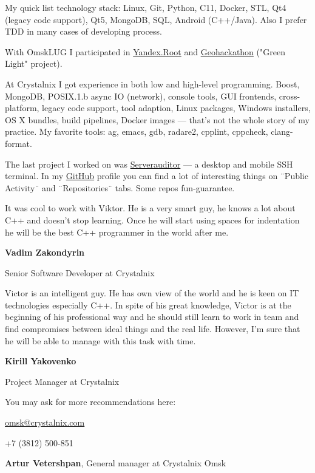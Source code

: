 \documentclass[letterpaper,11pt]{article}
\newlength{\outerbordwidth}
\newcommand{\resheading}[1]{\vspace{5pt}
  \parbox{\textwidth}{\setlength{\FrameSep}{\outerbordwidth}
    \begin{shaded}
\setlength{\fboxsep}{0pt}\framebox[\textwidth][l]{\setlength{\fboxsep}{4pt}\fcolorbox{shadecolorB}{shadecolorB}{\textbf{\sffamily{\mbox{~}\makebox[6.762in][l]{\large #1} \vphantom{p\^{E}}}}}}
    \end{shaded}
  }\vspace{-5pt}
}
\begin{document}
	My quick list technology stack: Linux, Git, Python, C11, Docker, STL, Qt4 (legacy code support), Qt5, MongoDB, SQL, Android (C++/Java). Also I prefer TDD in many cases of developing process.
	
	With OmskLUG I participated in \href{http://omsklug.com/members/chemtech/activity/759}{Yandex.Root} and \href{https://vk.com/geohackathon}{Geohackathon} ("Green Light" project).
	
	At Crystalnix I got experience in both low and high-level programming. Boost, MongoDB, POSIX.1.b async IO (network), console tools, GUI frontends, cross-platform, legacy code support, tool adaption, Linux packages, Windows installers, OS X bundles, build pipelines, Docker images --- that's not the whole story of my practice. My favorite tools: ag, emacs, gdb, radare2, cpplint, cppcheck, clang-format.
	
	The last project I worked on was \href{http://serverauditor.com/}{Serverauditor} --- a desktop and mobile SSH terminal.
	In my \href{https://github.com/RussianBruteForce}{GitHub} profile you can find a lot of interesting things on ¨Public Activity¨ and ¨Repositories¨ tabs. Some repos fun-guarantee.

\pagebreak

\resheading{Reviews}

It was cool to work with Viktor. He is a very smart guy, he knows a lot about C++ and doesn't stop learning. Once he will start using spaces for indentation he will be the best C++ programmer in the world after me.

\begin{flushright}
	
\textbf{Vadim Zakondyrin}

Senior Software Developer at Crystalnix
\end{flushright}


Victor is an intelligent guy. He has own view of the world and he is keen on IT technologies especially C++. In spite of his great knowledge, Victor is at the beginning of his professional way and he should still learn to work in team and find compromises between ideal things and the real life. However, I'm sure that he will be able to manage with this task with time.

\begin{flushright}
	
	\textbf{Kirill Yakovenko}
	
	Project Manager at Crystalnix
\end{flushright}


You may ask for more recommendations here:

\href{mailto:omsk@crystalnix.com}{omsk@crystalnix.com}

+7 (3812) 500-851 

\textbf{Artur Vetershpan}, General manager at Crystalnix Omsk
\end{document}
